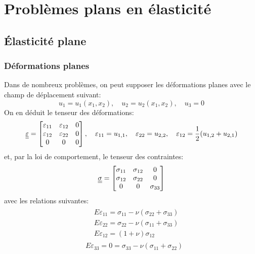 \chapter{Problèmes plans en élasticité}\label{chap:Ch08}
\section{Élasticité plane}\label{sec:Ch08-1}
\subsection{Déformations planes}\label{ssec:Ch08-1.1}
Dans de nombreux problèmes, on peut supposer les déformations planes avec le champ de déplacement suivant:
\begin{equation}
    u_1=u_1(x_1,x_2),\quad u_2=u_2(x_1,x_2),\quad u_3=0
    \label{eq:Ch08-001}
\end{equation}
On en déduit le tenseur des déformations: 
\begin{equation}
    \underline{\underline{\varepsilon}}=
    \begin{bmatrix}
        \varepsilon_{11} & \varepsilon_{12} & 0 \\
        \varepsilon_{12} & \varepsilon_{22} & 0 \\
        0                & 0                & 0 \\     
    \end{bmatrix},
    \quad
         \varepsilon_{11}= u_{1,1},\quad
         \varepsilon_{22}= u_{2,2},\quad
         \varepsilon_{12}= \frac{1}{2}(u_{1,2}+u_{2,1}) 
\label{eq:Ch08-002}
\end{equation}
et, par la loi de comportement, le tenseur des contraintes:
\begin{equation}
    \underline{\underline{\sigma}} =
    \begin{bmatrix}
        \sigma_{11} & \sigma_{12} & 0           \\
        \sigma_{12} & \sigma_{22} & 0           \\
        0           & 0           & \sigma_{33} \\     
    \end{bmatrix}
\label{eq:Ch08-003}
\end{equation}
avec les relations suivantes:
\begin{subequations}
   \begin{align}
&\!\begin{aligned}
     &E\varepsilon_{11} = \sigma_{11}-\nu(\sigma_{22}+\sigma_{33}) \\
     &E\varepsilon_{22} = \sigma_{22}-\nu(\sigma_{11}+\sigma_{33}) \\
     &E\varepsilon_{12} = (1+\nu)\sigma_{12}
   \end{aligned}
    \label{eq:Ch08-004}\\
&
     E\varepsilon_{33} = 0 = \sigma_{33}-\nu(\sigma_{11}+\sigma_{22})
    \label{eq:Ch08-005}
\end{align}
\end{subequations}
